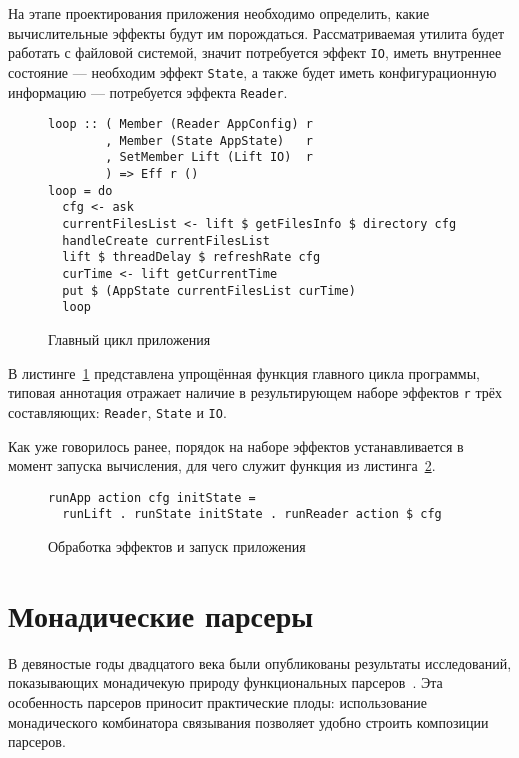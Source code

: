 На этапе проектирования приложения необходимо определить, какие вычислительные
эффекты будут им порождаться. Рассматриваемая утилита будет работать с файловой
системой, значит потребуется эффект \lstinline{IO}, иметь внутреннее 
состояние --- необходим эффект \lstinline{State}, а также будет иметь 
конфигурационную информацию --- потребуется эффекта \lstinline{Reader}.

\begin{figure}[t]
\begin{lstlisting}
loop :: ( Member (Reader AppConfig) r
        , Member (State AppState)   r
        , SetMember Lift (Lift IO)  r
        ) => Eff r ()
loop = do
  cfg <- ask
  currentFilesList <- lift $ getFilesInfo $ directory cfg
  handleCreate currentFilesList
  lift $ threadDelay $ refreshRate cfg
  curTime <- lift getCurrentTime
  put $ (AppState currentFilesList curTime)
  loop
\end{lstlisting}
\caption{Главный цикл приложения}
\label{listing:ftMainLoop}
\end{figure}

В листинге~\ref{listing:ftMainLoop} представлена упрощённая функция главного 
цикла программы, типовая аннотация отражает наличие в результирующем наборе 
эффектов \lstinline{r} трёх составляющих: \lstinline{Reader}, \lstinline{State} 
и \lstinline{IO}.

Как уже говорилось ранее, порядок на наборе эффектов устанавливается в момент 
запуска вычисления, для чего служит функция из листинга~\ref{listing:ftRun}.

\begin{figure}[t]
\begin{lstlisting}
runApp action cfg initState =
  runLift . runState initState . runReader action $ cfg
\end{lstlisting}
\caption{Обработка эффектов и запуск приложения}
\label{listing:ftRun}
\end{figure}

\chapter{Монадические парсеры}

В девяностые годы двадцатого века были опубликованы результаты исследований,
показывающих монадичекую природу функциональных парсеров~\cite{wadlerMonads}. 
Эта особенность парсеров приносит практические плоды: использование 
монадического комбинатора связывания позволяет удобно строить композиции 
парсеров.


